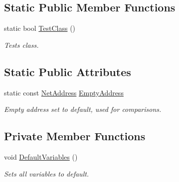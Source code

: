 \subsection*{Static Public Member Functions}
\begin{DoxyCompactItemize}
\item 
static bool \hyperlink{class_net_address_a573167584833614dda3422f3e5b19767}{TestClass} ()
\begin{DoxyCompactList}\small\item\em Tests class. \item\end{DoxyCompactList}\end{DoxyCompactItemize}
\subsection*{Static Public Attributes}
\begin{DoxyCompactItemize}
\item 
\hypertarget{class_net_address_a128c9ea028f73083786c6799b1fdd476}{
static const \hyperlink{class_net_address}{NetAddress} \hyperlink{class_net_address_a128c9ea028f73083786c6799b1fdd476}{EmptyAddress}}
\label{class_net_address_a128c9ea028f73083786c6799b1fdd476}

\begin{DoxyCompactList}\small\item\em Empty address set to default, used for comparisons. \item\end{DoxyCompactList}\end{DoxyCompactItemize}
\subsection*{Private Member Functions}
\begin{DoxyCompactItemize}
\item 
\hypertarget{class_net_address_a06c8dce13706bbd9bfb55ca1069f33b7}{
void \hyperlink{class_net_address_a06c8dce13706bbd9bfb55ca1069f33b7}{DefaultVariables} ()}
\label{class_net_address_a06c8dce13706bbd9bfb55ca1069f33b7}

\begin{DoxyCompactList}\small\item\em Sets all variables to default. \item\end{DoxyCompactList}\end{DoxyCompactItemize}
